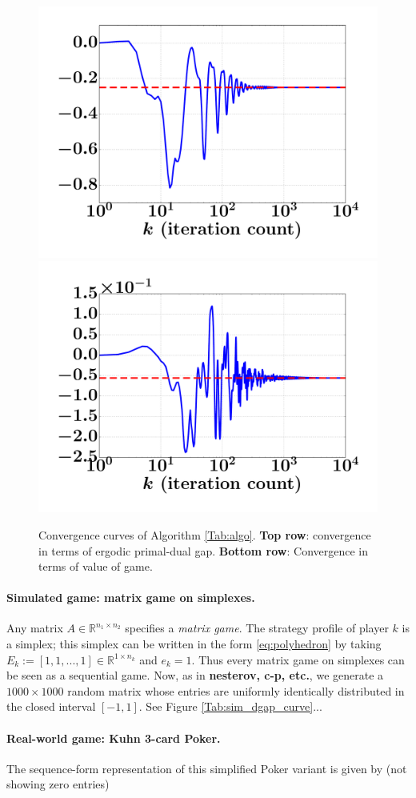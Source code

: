 \documentclass[envcountsame]{llncs} %
\begin{document}
\begin{figure}[!htpb]
  \hspace{-1em}
  \includegraphics[width=.33\linewidth]{SimplifiedPoker_NE.pdf}
  \hspace{-1em}
  \includegraphics[width=.33\linewidth]{Kuhn3112_NE.pdf}
  \caption{Convergence curves of Algorithm
    \ref{Tab:algo}. \textbf{Top row}: convergence in terms of ergodic
    primal-dual gap. \textbf{Bottom row}: Convergence in terms of
    value of game.}
  \label{Tab:dgap_curve}
\end{figure}

\paragraph{\textbf{Simulated game: matrix game on simplexes.}}
Any matrix $A \in \mathbb{R}^{n_1 \times n_2}$ specifies a
\textit{matrix game}. The strategy profile of player $k$ is a simplex;
this simplex can be written in the form \eqref{eq:polyhedron} by
taking $E_k := [1, 1, ..., 1] \in \mathbb{R}^{1 \times n_k}$ and $e_k
= 1$. Thus every matrix game on simplexes can be seen as a sequential
game. Now, as in \textbf{nesterov, c-p, etc.}, we generate a $1000
\times 1000$ random matrix whose entries are uniformly identically
distributed in the closed interval $[-1, 1]$. See Figure \ref{Tab:sim_dgap_curve}...

\paragraph{\textbf{Real-world game: Kuhn 3-card Poker.}}
The sequence-form representation of this simplified Poker variant
\cite{kuhn} is given by (not showing zero entries)\\
\end{document}
